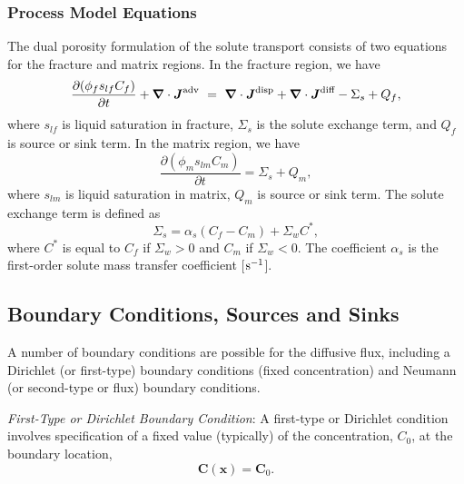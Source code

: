 \subsubsection{Process Model Equations} 

The dual porosity formulation of the solute transport consists of two equations
for the fracture and matrix regions. 
In the fracture region, we have \citep{simunek-vangenuchten_2008}
\begin{equation}  \label{eq:MassConservation}
  \frac{\partial (\phi_f s_{lf} C_f)}{\partial t} 
  + 
  {\boldsymbol{\nabla}} \cdot {\boldsymbol{J}}^\text{adv} \ =\  {\boldsymbol{\nabla}} \cdot {\boldsymbol{J}}^\text{disp} 
  + 
  {\boldsymbol{\nabla}} \cdot {\boldsymbol{J}}^\text{diff} - \Sigma_s + Q_f,
\end{equation}
where $s_{lf}$ is liquid saturation in fracture, 
$\Sigma_s$ is the solute exchange term,
and $Q_f$ is source or sink term.
In the matrix region, we have
$$
  \frac{\partial (\phi_m s_{lm} C_m)}{\partial t}
  = \Sigma_s + Q_m,
$$
where $s_{lm}$ is liquid saturation in matrix, $Q_m$ is source or sink term.
The solute exchange term is defined as
$$
  \Sigma_s = \alpha_s (C_f - C_m) + \Sigma_w C^*,
$$
where $C^*$ is equal to $C_f$ if $\Sigma_w > 0$ and $C_m$ if $\Sigma_w < 0$.
The coefficient $\alpha_s$ is the first-order solute mass transfer coefficient [${\rm s}^{-1}$].



\subsection{Boundary Conditions, Sources and Sinks} 
\label{sec:transport-boundary-conditions}

\noindent 
A number of boundary conditions are possible for the diffusive flux, 
including a Dirichlet (or first-type) boundary conditions (fixed concentration) 
and Neumann (or second-type or flux) boundary conditions. 

\noindent \textit{First-Type or Dirichlet Boundary Condition}:  
A first-type or Dirichlet condition involves specification of a fixed value (typically) of the concentration, $C_0$, at the boundary location,
\begin{equation} \label{eq:Dirichlet}
  \boldsymbol{C}(\boldsymbol{x})=\boldsymbol{C}_{0} .
\end{equation}

